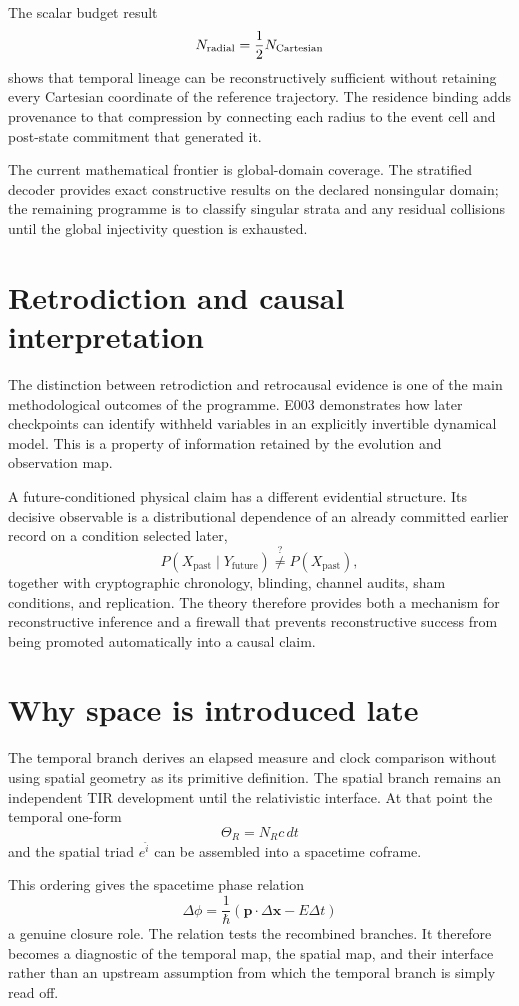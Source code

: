 \documentclass[11pt]{book}
\begin{document}
The scalar budget result
\[
N_{\rm radial}=\frac12N_{\rm Cartesian}
\]
shows that temporal lineage can be reconstructively sufficient without retaining every Cartesian coordinate of the reference trajectory. The residence binding adds provenance to that compression by connecting each radius to the event cell and post-state commitment that generated it.

The current mathematical frontier is global-domain coverage. The stratified decoder provides exact constructive results on the declared nonsingular domain; the remaining programme is to classify singular strata and any residual collisions until the global injectivity question is exhausted.

\section{Retrodiction and causal interpretation}

The distinction between retrodiction and retrocausal evidence is one of the main methodological outcomes of the programme. E003 demonstrates how later checkpoints can identify withheld variables in an explicitly invertible dynamical model. This is a property of information retained by the evolution and observation map.

A future-conditioned physical claim has a different evidential structure. Its decisive observable is a distributional dependence of an already committed earlier record on a condition selected later,
\[
P(X_{\mathrm{past}}\mid Y_{\mathrm{future}})
\stackrel{?}{\neq}
P(X_{\mathrm{past}}),
\]
together with cryptographic chronology, blinding, channel audits, sham conditions, and replication. The theory therefore provides both a mechanism for reconstructive inference and a firewall that prevents reconstructive success from being promoted automatically into a causal claim.

\section{Why space is introduced late}

The temporal branch derives an elapsed measure and clock comparison without using spatial geometry as its primitive definition. The spatial branch remains an independent TIR development until the relativistic interface. At that point the temporal one-form
\[
\Theta_R=N_Rc\,dt
\]
and the spatial triad \(e^{\hat i}\) can be assembled into a spacetime coframe.

This ordering gives the spacetime phase relation
\[
\Delta\phi
=
\frac{1}{\hbar}
(\mathbf p\cdot\Delta\mathbf x-E\Delta t)
\]
a genuine closure role. The relation tests the recombined branches. It therefore becomes a diagnostic of the temporal map, the spatial map, and their interface rather than an upstream assumption from which the temporal branch is simply read off.
\end{document}
